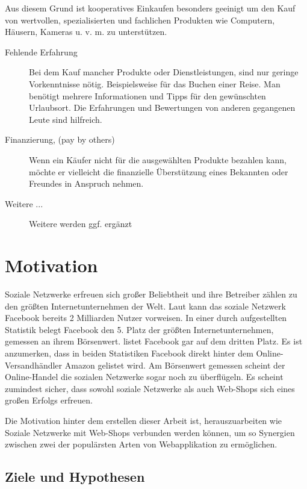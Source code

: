 Aus diesem Grund ist kooperatives Einkaufen besonders geeinigt um den Kauf von wertvollen, spezialisierten und fachlichen Produkten wie Computern, Häusern, Kameras u. v. m. zu unterstützen.

\begin{description}
\item[Fehlende Erfahrung] Bei dem Kauf mancher Produkte oder Dienstleistungen, sind nur geringe Vorkenntnisse nötig. Beispielsweise für das Buchen einer Reise. Man benötigt mehrere Informationen und Tipps für den gewünschten Urlaubsort. Die Erfahrungen und Bewertungen von anderen gegangenen Leute sind hilfreich.
\item[Finanzierung, (pay by others)] Wenn ein Käufer nicht für die ausgewählten Produkte bezahlen kann, möchte er vielleicht die finanzielle Überstützung eines Bekannten oder Freundes in Anspruch nehmen.
\item[Weitere ...] Weitere werden ggf. ergänzt
\end{description}


\section{Motivation}

Soziale Netzwerke erfreuen sich großer Beliebtheit und ihre Betreiber zählen zu den größten Internetunternehmen der Welt. Laut \textcite{sokolov:facebook} kann das soziale Netzwerk Facebook bereits 2 Milliarden Nutzer vorweisen. In einer durch \textcite{nasdaq} aufgestellten Statistik belegt Facebook den 5. Platz der größten Internetunternehmen, gemessen an ihrem Börsenwert. \textcite{mittermeier} listet Facebook gar auf dem dritten Platz. Es ist anzumerken, dass in beiden Statistiken Facebook direkt hinter dem Online-Versandhändler Amazon gelistet wird. Am Börsenwert gemessen scheint der Online-Handel die sozialen Netzwerke sogar noch zu überflügeln. Es scheint zumindest sicher, dass sowohl soziale Netzwerke als auch Web-Shops sich eines großen Erfolgs erfreuen.

Die Motivation hinter dem erstellen dieser Arbeit ist, herauszuarbeiten wie Soziale Netzwerke mit Web-Shops verbunden werden können, um so Synergien zwischen zwei der populärsten Arten von Webapplikation zu ermöglichen.


\subsection{Ziele und Hypothesen}

